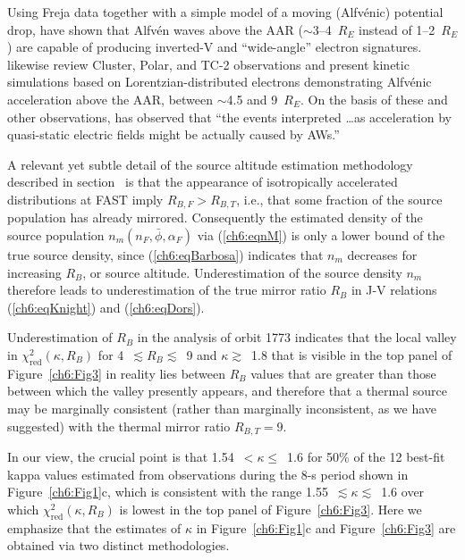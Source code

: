   Using Freja data together with a simple model of a moving (Alfv\'{e}nic)
  potential drop, \citet{Andersson2002a} have shown that Alfv\'{e}n waves above
  the AAR ($\sim$3--4~$R_E$ instead of 1--2~$R_E$) are capable of producing
  inverted-V and ``wide-angle'' electron signatures. \citet{Watt2012} likewise
  review Cluster, Polar, and TC-2 observations and present kinetic simulations
  based on Lorentzian-distributed electrons demonstrating Alfv\'{e}nic
  acceleration above the AAR, between $\sim$4.5 and 9~$R_E$. On the basis of
  these and other observations, \citet{Mottez2016} has observed that ``the
  events interpreted \dots as acceleration by quasi-static electric fields might
  be actually caused by AWs.''

  A relevant yet subtle detail of the source altitude estimation methodology
  described in section~\label{ssSourceAlt} is that the appearance of
  isotropically accelerated distributions at FAST imply $R_{B,F} > R_{B,T}$,
  i.e., that some fraction of the source population has already
  mirrored. Consequently the estimated density of the source population
  $n_m ( n_F, \bar{\phi}, \alpha_F )$ via (\ref{ch6:eqnM}) is only a lower bound
  of the true source density, since (\ref{ch6:eqBarbosa}) indicates that $n_m$
  decreases for increasing $R_B$, or source altitude. Underestimation of the
  source density $n_m$ therefore leads to underestimation of the true mirror
  ratio $R_B$ in J-V relations (\ref{ch6:eqKnight}) and (\ref{ch6:eqDors}).

  Underestimation of $R_B$ in the analysis of orbit 1773 indicates that the
  local valley in $\chi^2_{\mathrm{red}} (\kappa, R_B)$ for
  4~$\lesssim R_B \lesssim$~9 and $\kappa \gtrsim$~1.8 that is visible in the
  top panel of Figure~\ref{ch6:Fig3} in reality lies between $R_B$ values that
  are greater than those between which the valley presently appears, and
  therefore that a thermal source may be marginally consistent (rather than
  marginally inconsistent, as we have suggested) with the thermal mirror ratio
  $R_{B,T} = 9$.

  In our view, the crucial point is that 1.54~$< \kappa \leq$~1.6 for 50\% of
  the 12 best-fit kappa values estimated from observations during the 8-s period
  shown in Figure~\ref{ch6:Fig1}c, which is consistent with the range
  1.55~$\lesssim \kappa \lesssim$~1.6 over which
  $\chi^2_{\mathrm{red}} (\kappa, R_B)$ is lowest in the top panel of
  Figure~\ref{ch6:Fig3}. Here we emphasize that the estimates of $\kappa$ in
  Figure~\ref{ch6:Fig1}c and Figure~\ref{ch6:Fig3} are obtained via two distinct
  methodologies.
  
